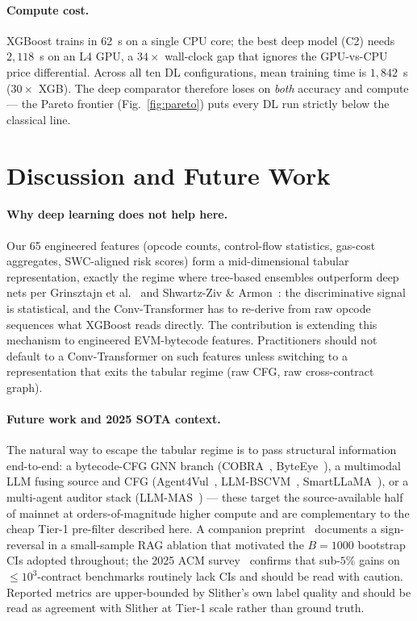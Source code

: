 \documentclass[twocolumn, 10pt]{article}
\begin{document}
\paragraph{Compute cost.}
XGBoost trains in 62~s on a single CPU core; the best deep model
(C2) needs $2{,}118$~s on an L4 GPU, a $34\times$ wall-clock gap
that ignores the GPU-vs-CPU price differential. Across all ten DL
configurations, mean training time is $1{,}842$~s ($30\times$ XGB).
The deep comparator therefore loses on \emph{both} accuracy and
compute --- the Pareto frontier (Fig.~\ref{fig:pareto}) puts every
DL run strictly below the classical line.

\section{Discussion and Future Work}\label{sec:disc}

\paragraph{Why deep learning does not help here.}
Our 65 engineered features (opcode counts, control-flow statistics,
gas-cost aggregates, SWC-aligned risk scores) form a mid-dimensional
tabular representation, exactly the regime where tree-based ensembles
outperform deep nets per Grinsztajn et al.~\cite{grinsztajn2022}
and Shwartz-Ziv \& Armon~\cite{shwartz2022}: the discriminative
signal is statistical, and the Conv-Transformer has to re-derive
from raw opcode sequences what XGBoost reads directly. The
contribution is extending this mechanism to engineered EVM-bytecode
features. Practitioners should not default to a Conv-Transformer on
such features unless switching to a representation that exits the
tabular regime (raw CFG, raw cross-contract graph).

\paragraph{Future work and 2025 SOTA context.}
The natural way to escape the tabular regime is to pass structural
information end-to-end: a bytecode-CFG GNN branch
(COBRA~\cite{cobra}, ByteEye~\cite{byteeye}), a multimodal LLM
fusing source and CFG (Agent4Vul~\cite{agent4vul},
LLM-BSCVM~\cite{llmbscvm}, SmartLLaMA~\cite{smartllama}), or a
multi-agent auditor stack (LLM-MAS~\cite{llmmas}) — these target the
source-available half of mainnet at orders-of-magnitude higher
compute and are complementary to the cheap Tier-1 pre-filter
described here. A companion preprint~\cite{preprintRAG} documents a
sign-reversal in a small-sample RAG ablation that motivated the
$B\!=\!1000$ bootstrap CIs adopted throughout; the 2025 ACM
survey~\cite{learnSurvey} confirms that sub-$5\%$ gains on
$\le\!10^{3}$-contract benchmarks routinely lack CIs and should be
read with caution. Reported metrics are upper-bounded by Slither's
own label quality and should be read as agreement with Slither at
Tier-1 scale rather than ground truth.
\end{document}
